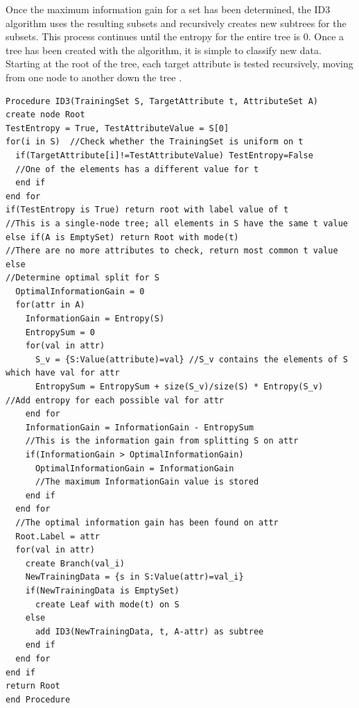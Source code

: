 Once the maximum information gain for a set has been determined, the ID3 algorithm uses the resulting subsets and recursively creates new subtrees for the subsets. This process continues until the entropy for the entire tree is 0. Once a tree has been created with the algorithm, it is simple to classify new data. Starting at the root of the tree, each target attribute is tested recursively, moving from one node to another down the tree \cite{sega07}.\\

\begin{lstlisting}
Procedure ID3(TrainingSet S, TargetAttribute t, AttributeSet A)
create node Root
TestEntropy = True, TestAttributeValue = S[0]
for(i in S)  //Check whether the TrainingSet is uniform on t
  if(TargetAttribute[i]!=TestAttributeValue) TestEntropy=False
  //One of the elements has a different value for t
  end if
end for
if(TestEntropy is True) return root with label value of t
//This is a single-node tree; all elements in S have the same t value
else if(A is EmptySet) return Root with mode(t)
//There are no more attributes to check, return most common t value
else
//Determine optimal split for S
  OptimalInformationGain = 0
  for(attr in A)
    InformationGain = Entropy(S)
    EntropySum = 0
    for(val in attr)
      S_v = {S:Value(attribute)=val} //S_v contains the elements of S which have val for attr
      EntropySum = EntropySum + size(S_v)/size(S) * Entropy(S_v)  //Add entropy for each possible val for attr
    end for
    InformationGain = InformationGain - EntropySum
    //This is the information gain from splitting S on attr
    if(InformationGain > OptimalInformationGain)
      OptimalInformationGain = InformationGain
      //The maximum InformationGain value is stored
    end if
  end for
  //The optimal information gain has been found on attr
  Root.Label = attr
  for(val in attr)
    create Branch(val_i)
    NewTrainingData = {s in S:Value(attr)=val_i}
    if(NewTrainingData is EmptySet)
      create Leaf with mode(t) on S
    else
      add ID3(NewTrainingData, t, A-attr) as subtree
    end if
  end for
end if
return Root
end Procedure
\end{lstlisting}

